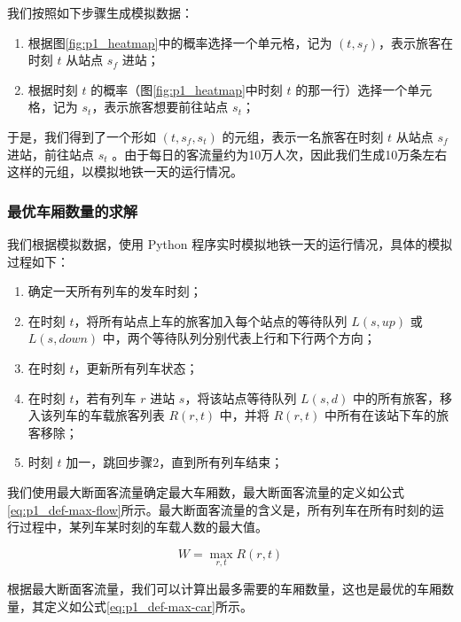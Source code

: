 \documentclass[12pt,a4paper]{mcmthesis}
\begin{document}
    我们按照如下步骤生成模拟数据：

    \begin{enumerate}
        \item 根据图\ref{fig:p1_heatmap}中的概率选择一个单元格，记为 $(t,s_f)$，表示旅客在时刻 $t$ 从站点 $s_f$ 进站；
        \item 根据时刻 $t$ 的概率（图\ref{fig:p1_heatmap}中时刻 $t$ 的那一行）选择一个单元格，记为 $s_t$，表示旅客想要前往站点 $s_t$；
    \end{enumerate}

    于是，我们得到了一个形如 $(t,s_f,s_t)$ 的元组，表示一名旅客在时刻 $t$ 从站点 $s_f$ 进站，前往站点 $s_t$ 。由于每日的客流量约为10万人次，因此我们生成10万条左右这样的元组，以模拟地铁一天的运行情况。

    \subsubsection{最优车厢数量的求解}

    我们根据模拟数据，使用 Python 程序实时模拟地铁一天的运行情况，具体的模拟过程如下：

    \begin{enumerate}
        \item 确定一天所有列车的发车时刻；
        \item 在时刻 $t$，将所有站点上车的旅客加入每个站点的等待队列 $L(s,up)$ 或 $L(s,down)$ 中，两个等待队列分别代表上行和下行两个方向；
        \item 在时刻 $t$，更新所有列车状态；
        \item 在时刻 $t$，若有列车 $r$ 进站 $s$，将该站点等待队列 $L(s,d)$ 中的所有旅客，移入该列车的车载旅客列表 $R(r,t)$ 中，并将 $R(r,t)$ 中所有在该站下车的旅客移除；
        \item 时刻 $t$ 加一，跳回步骤2，直到所有列车结束；
    \end{enumerate}

    我们使用最大断面客流量确定最大车厢数，最大断面客流量的定义如公式\ref{eq:p1_def-max-flow}所示。最大断面客流量的含义是，所有列车在所有时刻的运行过程中，某列车某时刻的车载人数的最大值。

    \begin{equation}
        W = \max_{r,t} R(r,t)
        \label{eq:p1_def-max-flow}
    \end{equation}

    根据最大断面客流量，我们可以计算出最多需要的车厢数量，这也是最优的车厢数量，其定义如公式\ref{eq:p1_def-max-car}所示。
\end{document}
